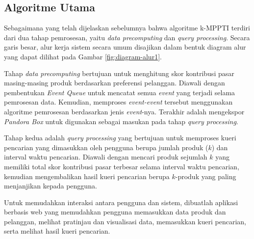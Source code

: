 \subsection{Algoritme Utama}
\tab Sebagaimana yang telah dijelaskan sebelumnya bahwa algoritme k-MPPTI terdiri dari dua tahap pemrosesan, yaitu \textit{data precomputing} dan \textit{query processing}. Secara garis besar, alur kerja sistem secara umum disajikan dalam bentuk diagram alur yang dapat dilihat pada Gambar \ref{fig:diagram-alur1}.

Tahap \textit{data precomputing} bertujuan untuk menghitung skor kontribusi pasar masing-masing produk berdasarkan preferensi pelanggan. Diawali dengan pembentukan \textit{Event Queue} untuk mencatat semua \textit{event} yang terjadi selama pemrosesan data. Kemudian, memproses \textit{event-event} tersebut menggunakan algoritme pemrosesan berdasarkan jenis \textit{event}-nya. Terakhir adalah mengekspor \textit{Pandora Box} untuk digunakan sebagai masukan pada tahap \textit{query processing}.

Tahap kedua adalah \textit{query processing} yang bertujuan untuk memproses kueri pencarian yang dimasukkan oleh pengguna berupa jumlah produk ($k$) dan interval waktu pencarian. Diawali dengan mencari produk sejumlah $k$ yang memiliki total skor kontribusi pasar terbesar selama interval waktu pencarian, kemudian mengembalikan hasil kueri pencarian berupa $k$-produk yang paling menjanjikan kepada pengguna.

Untuk memudahkan interaksi antara pengguna dan sistem, dibuatlah aplikasi berbasis web yang memudahkan pengguna memasukkan data produk dan pelanggan, melihat pratinjau dan visualisasi data, memasukkan kueri pencarian, serta melihat hasil kueri pencarian.


